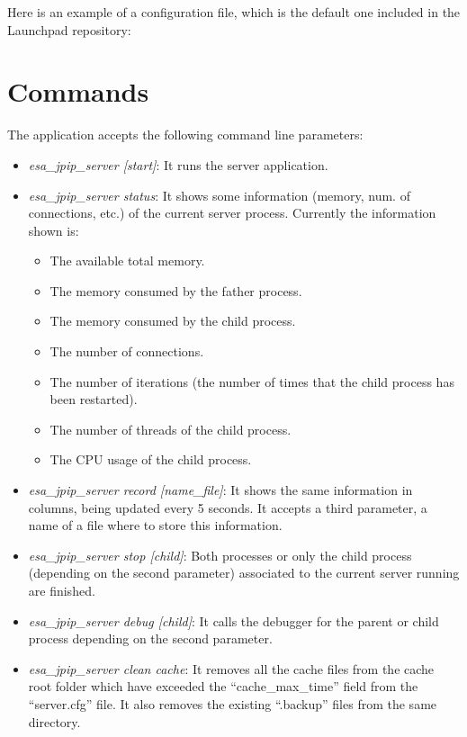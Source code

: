 Here is an example of a configuration file, which is the default one
included in the Launchpad repository:




\section{Commands}
\label{commands}

The application accepts the following command line parameters:

\begin{itemize}
	\item \textit{esa\_jpip\_server [start]}: It runs the server application.
	\item \textit{esa\_jpip\_server status}: It shows some information (memory, num. of connections, etc.) of the current server process.
		Currently the information shown is:
		\begin{itemize}
			\item The available total memory.
			\item	The memory consumed by the father process.
			\item	The memory consumed by the child process.
			\item	The number of connections.
			\item	The number of iterations (the number of times that the child process has been restarted).
			\item	The number of threads of the child process.
			\item	The CPU usage of the child process.
		\end{itemize}
	\item \textit{esa\_jpip\_server record [name\_file]}: It shows the same information in columns, being updated every 5 seconds. It accepts a third parameter, a name of a file where to store this information.
	\item \textit{esa\_jpip\_server stop [child]}: Both processes or only the child process (depending on the second parameter) associated to the current server running are finished. 
	\item \textit{esa\_jpip\_server debug [child]}: It calls the debugger for the parent or child process depending on the second parameter.
 	\item \textit{esa\_jpip\_server clean cache}: It removes all the cache files from the cache root folder which have exceeded the ``cache\_max\_time'' field from the ``server.cfg'' file.
It also removes the existing ``.backup'' files from the same directory.
\end{itemize}


